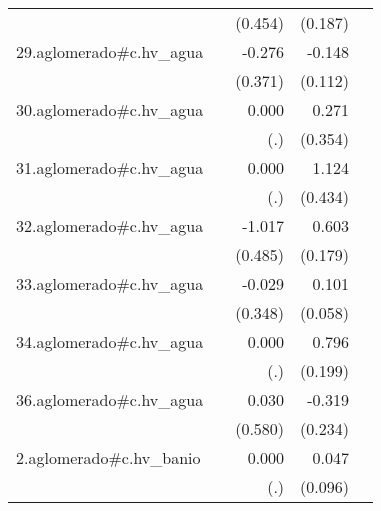 {\begin{longtable}{l*{4}{D{.}{.}{-1}}}
            &                     &     (0.454)         &     (0.187)         &                     \\
\addlinespace
29.aglomerado#c.hv\_agua&                     &      -0.276         &      -0.148         &                     \\
            &                     &     (0.371)         &     (0.112)         &                     \\
\addlinespace
30.aglomerado#c.hv\_agua&                     &       0.000         &       0.271         &                     \\
            &                     &         (.)         &     (0.354)         &                     \\
\addlinespace
31.aglomerado#c.hv\_agua&                     &       0.000         &       1.124\sym{**} &                     \\
            &                     &         (.)         &     (0.434)         &                     \\
\addlinespace
32.aglomerado#c.hv\_agua&                     &      -1.017\sym{*}  &       0.603\sym{***}&                     \\
            &                     &     (0.485)         &     (0.179)         &                     \\
\addlinespace
33.aglomerado#c.hv\_agua&                     &      -0.029         &       0.101         &                     \\
            &                     &     (0.348)         &     (0.058)         &                     \\
\addlinespace
34.aglomerado#c.hv\_agua&                     &       0.000         &       0.796\sym{***}&                     \\
            &                     &         (.)         &     (0.199)         &                     \\
\addlinespace
36.aglomerado#c.hv\_agua&                     &       0.030         &      -0.319         &                     \\
            &                     &     (0.580)         &     (0.234)         &                     \\
\addlinespace
2.aglomerado#c.hv\_banio&                     &       0.000         &       0.047         &                     \\
            &                     &         (.)         &     (0.096)         &                     \\

\end{longtable}}
